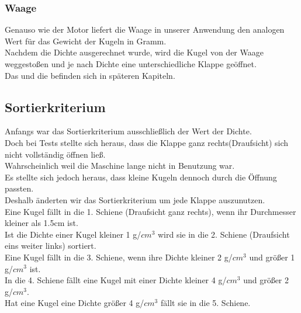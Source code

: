 \documentclass[12pt,a4paper]{article}
\begin{document}
\subsubsection{Waage}
Genauso wie der Motor liefert die Waage in unserer Anwendung den analogen Wert für das Gewicht der Kugeln in Gramm.\\
Nachdem die Dichte ausgerechnet wurde, wird die Kugel von der Waage weggestoßen und je nach Dichte eine unterschiedliche Klappe geöffnet.\\
Das  und die  befinden sich in späteren Kapiteln.\\
\clearpage

\subsection{Sortierkriterium}\label{Sortierkriterium}
Anfangs war das Sortierkriterium ausschließlich der Wert der Dichte.\\
Doch bei Tests stellte sich heraus, dass die Klappe ganz rechts(Draufsicht) sich nicht vollständig öffnen ließ.\\ 
Wahrscheinlich weil die Maschine lange nicht in Benutzung war.\\
Es stellte sich jedoch heraus, dass kleine Kugeln dennoch durch die Öffnung passten.\\
Deshalb änderten wir das Sortierkriterium um jede Klappe auszunutzen.\\
Eine Kugel fällt in die 1. Schiene (Draufsicht ganz rechts), wenn ihr Durchmesser kleiner als 1.5cm ist.\\
Ist die Dichte einer Kugel kleiner 1 g/$cm^3$ wird sie in die 2. Schiene (Draufsicht eins weiter links) sortiert.\\
Eine Kugel fällt in die 3. Schiene, wenn ihre Dichte kleiner 2 g/$cm^3$ und größer 1 g/$cm^3$ ist.\\
In die 4. Schiene fällt eine Kugel mit einer Dichte kleiner 4 g/$cm^3$ und größer 2 g/$cm^3$.\\
Hat eine Kugel eine Dichte größer 4 g/$cm^3$ fällt sie in die 5. Schiene.\\ 
\newpage
\end{document}
